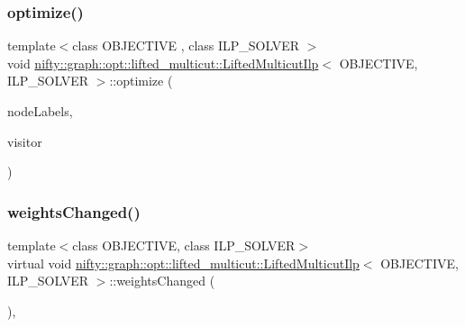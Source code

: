 \subsubsection{\texorpdfstring{optimize()}{optimize()}}
{\footnotesize\ttfamily template$<$class O\+B\+J\+E\+C\+T\+I\+VE , class I\+L\+P\+\_\+\+S\+O\+L\+V\+ER $>$ \\
void \hyperlink{classnifty_1_1graph_1_1opt_1_1lifted__multicut_1_1LiftedMulticutIlp}{nifty\+::graph\+::opt\+::lifted\+\_\+multicut\+::\+Lifted\+Multicut\+Ilp}$<$ O\+B\+J\+E\+C\+T\+I\+VE, I\+L\+P\+\_\+\+S\+O\+L\+V\+ER $>$\+::optimize (\begin{DoxyParamCaption}\item[{\hyperlink{classnifty_1_1graph_1_1opt_1_1lifted__multicut_1_1LiftedMulticutIlp_a05df928d48fd5cd43241c999314aa92f}{Node\+Labels\+Type} \&}]{node\+Labels,  }\item[{\hyperlink{classnifty_1_1graph_1_1opt_1_1lifted__multicut_1_1LiftedMulticutIlp_a6ac1e4783a7442ae1ff633dd5f008804}{Visitor\+Base\+Type} $\ast$}]{visitor }\end{DoxyParamCaption})\hspace{0.3cm}{\ttfamily [virtual]}}

\mbox{\label{classnifty_1_1graph_1_1opt_1_1lifted__multicut_1_1LiftedMulticutIlp_a3d487db0bd9410f25dd800d04a6633e8}} 
\subsubsection{\texorpdfstring{weights\+Changed()}{weightsChanged()}}
{\footnotesize\ttfamily template$<$class O\+B\+J\+E\+C\+T\+I\+VE, class I\+L\+P\+\_\+\+S\+O\+L\+V\+ER$>$ \\
virtual void \hyperlink{classnifty_1_1graph_1_1opt_1_1lifted__multicut_1_1LiftedMulticutIlp}{nifty\+::graph\+::opt\+::lifted\+\_\+multicut\+::\+Lifted\+Multicut\+Ilp}$<$ O\+B\+J\+E\+C\+T\+I\+VE, I\+L\+P\+\_\+\+S\+O\+L\+V\+ER $>$\+::weights\+Changed (\begin{DoxyParamCaption}{ }\end{DoxyParamCaption})\hspace{0.3cm}{\ttfamily [inline]}, {\ttfamily [virtual]}}



